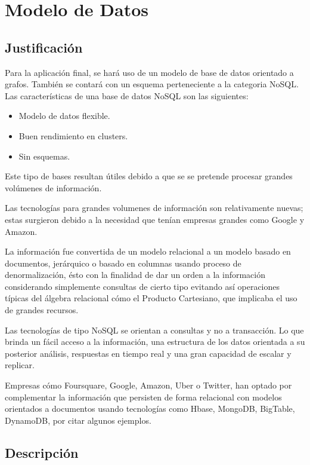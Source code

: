 \clearpage
\section{Modelo de Datos}

\subsection{Justificación}
Para la aplicación final, se hará uso de un modelo de base de datos orientado a grafos. También se contará con un esquema perteneciente a la categoria NoSQL.
 Las características de una base de datos NoSQL son las siguientes: 

\begin{itemize}
  \item Modelo de datos flexible.
  \item Buen rendimiento en clusters.
  \item Sin esquemas.
\end{itemize}

Este tipo de bases resultan útiles debido a que se se pretende procesar grandes volúmenes de información.

Las tecnologías para grandes volumenes de información son relativamente nuevas; estas surgieron debido a la necesidad que tenían empresas grandes como Google y Amazon.

La información fue convertida de un modelo relacional a un modelo basado en documentos, jerárquico o basado en columnas usando proceso de denormalización, ésto con la finalidad de dar un orden a la información considerando simplemente consultas de cierto tipo evitando así operaciones típicas del álgebra relacional cómo el Producto Cartesiano, que implicaba el uso de grandes recursos.

Las tecnologías de tipo NoSQL se orientan a consultas y no a transacción. Lo que brinda un fácil acceso a la información, una estructura de los datos orientada a su posterior análisis, respuestas en tiempo real y una gran capacidad de escalar y replicar.

Empresas cómo Foursquare, Google, Amazon, Uber o Twitter, han optado por complementar la información que persisten de forma relacional con modelos orientados a documentos usando tecnologías como Hbase, MongoDB, BigTable, DynamoDB, por citar algunos ejemplos.

\subsection{Descripción}

